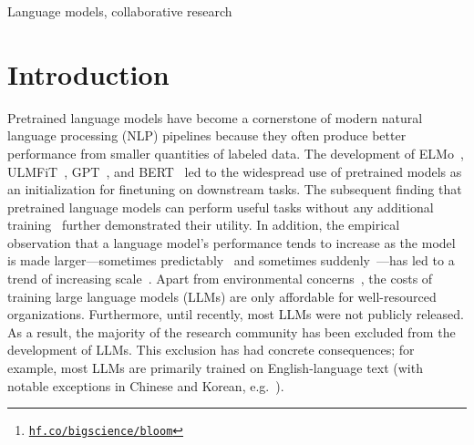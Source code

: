 \documentclass[twoside,11pt]{article}
\begin{document}
\begin{abstract}%
Large language models (LLMs) have been shown to be able to perform new tasks based on a few demonstrations or natural language instructions.
While these capabilities have led to widespread adoption, most LLMs are developed by resource-rich organizations and are frequently kept from the public.
As a step towards democratizing this powerful technology, we present BLOOM, a 176B-parameter open-access language model designed and built thanks to a collaboration of hundreds of researchers.
BLOOM is a decoder-only Transformer language model that was trained on the ROOTS corpus, a dataset comprising hundreds of sources in 46 natural and 13 programming languages (59 in total).
We find that BLOOM achieves competitive performance on a wide variety of benchmarks, with stronger results after undergoing multitask prompted finetuning.
To facilitate future research and applications using LLMs, we publicly release our models and code under the Responsible AI  License.\footnote{\href{https://hf.co/bigscience/bloom}{\texttt{hf.co/bigscience/bloom}}}
\end{abstract}

\begin{keywords}
Language models, collaborative research
\end{keywords}

\section{Introduction}

Pretrained language models have become a cornerstone of modern natural language processing (NLP) pipelines because they often produce better performance from smaller quantities of labeled data.
The development of ELMo~\citep{peters2018deep}, ULMFiT~\citep{howard2018universal}, GPT~\citep{radford2018improving}, and BERT~\citep{devlin2019bert} led to the widespread use of pretrained models as an initialization for finetuning on downstream tasks.
The subsequent finding that pretrained language models can perform useful tasks without any additional training~\citep{radford2019language,brown2020language} further demonstrated their utility.
In addition, the empirical observation that a language model's performance tends to increase as the model is made larger---sometimes predictably~\citep{hestness2017deep,kaplan2020scaling,hoffmann2022training} and sometimes suddenly~\citep{wei2022emergent}---has led to a trend of increasing scale~\citep{zeng2021pangu, rae2021scaling, smith2022using, chowdhery2022palm}. 
Apart from environmental concerns~\citep{strubell2019energy,lacoste2019quantifying,schwartz2020green}, the costs of training large language models (LLMs) are only affordable for well-resourced organizations.
Furthermore, until recently, most LLMs were not publicly released.
As a result, the majority of the research community has been excluded from the development of LLMs.
This exclusion has had concrete consequences; for example, most LLMs are primarily trained on English-language text (with notable exceptions in Chinese and Korean, e.g.~\citealp{wang2021ernie,zeng2021pangu,kim2021changes}).
\end{document}
